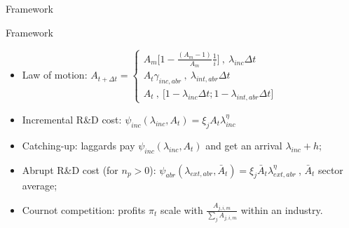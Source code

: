 \documentclass[11pt]{beamer}
\begin{document}
\begin{frame}{Framework}
	\begin{center}
	\begin{figure}\centering\label{Innov7}
	\end{figure}
	\end{center}
\end{frame}

\begin{frame}{Framework}
	\begin{itemize}\itemsep10pt	
	\item Law of motion: $A_{t+\Delta t} =\begin{cases}
               A_m\Big[1 - \frac{(A_m - 1)}{A_m}\frac{1}{i}\Big]\:,\: \lambda_{inc}\Delta t\\
               A_t\gamma_{inc,abr}\:,\: \lambda_{int,abr}\Delta t\\
               A_t \:, \: \big[1 - \lambda_{inc}\Delta t; 1 - \lambda_{int,abr}\Delta t\big] 
    \end{cases}$
	\item Incremental R\&D cost: $\psi_{inc}(\lambda_{inc}, A_{t}) = \xi_j A_t \lambda_{inc}^{\eta}$
	\item Catching-up: laggards pay $\psi_{inc}(\lambda_{inc}, A_{t})$ and get an arrival $\lambda_{inc} + h$;
	\item Abrupt R\&D cost (for $n_p > 0$): $\psi_{abr}(\lambda_{ext,abr}, \bar{A}_{t}) = \xi_j \bar{A}_t \lambda_{ext,abr}^{\eta}\:$, $\bar{A}_{t}$ sector average;
	\item Cournot competition: profits $\pi_t$ scale with $\frac{A_{j,i,m}}{\sum_{j}A_{j,i,m}}$ within an industry.
	\end{itemize}
\end{frame}
\end{document}
